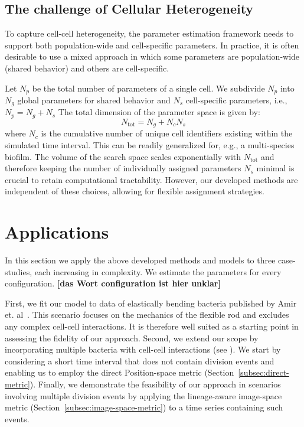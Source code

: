\documentclass[10pt,letterpaper]{article}
\begin{document}
\subsection{The challenge of Cellular Heterogeneity}
\label{sec:role-of-heterogeneity}

To capture cell-cell heterogeneity, the parameter estimation framework needs to support both
population-wide and cell-specific parameters.
In practice, it is often desirable to use a mixed approach in which some parameters are
population-wide (shared behavior) and others are cell-specific.

Let $N_p$ be the total number of parameters of a single cell.
We subdivide $N_p$ into $N_g$ global parameters for shared behavior and $N_s$ cell-specific
parameters, i.e., $N_p=N_g+N_s$
The total dimension of the parameter space is given by:
\begin{equation}
    N_\text{tot} = N_g + N_cN_s
\end{equation}
where $N_c$ is the cumulative number of unique cell identifiers existing within the simulated time
interval.
This can be readily generalized for, e.g., a multi-species biofilm.
The volume of the search space scales exponentially with $N_\text{tot}$ and therefore keeping the
number of individually assigned parameters $N_s$ minimal is crucial to retain computational
tractability.
However, our developed methods are independent of these choices, allowing for flexible assignment
strategies.

\section{Applications}
In this section we apply the above developed methods and models to three case-studies, each
increasing in complexity. We estimate the parameters for every configuration.
{\bf [das Wort configuration ist hier unklar]}

First, we fit our model to data of elastically bending bacteria published by Amir et.
al~\cite{Amir2014,Amir2014_2}.
This scenario focuses on the mechanics of the flexible rod and excludes any complex cell-cell
interactions.
It is therefore well suited as a starting point in assessing the fidelity of our approach.
Second, we extend our scope by incorporating multiple bacteria with cell-cell interactions
(see ).
We start by considering a short time interval that does not contain division events and enabling us
to employ the direct Position-space metric (Section~\ref{subsec:direct-metric}).
Finally, we demonstrate the feasibility of our approach in scenarios involving multiple division
events by applying the lineage-aware image-space metric (Section~\ref{subsec:image-space-metric})
to a time series containing such events.
\end{document}
